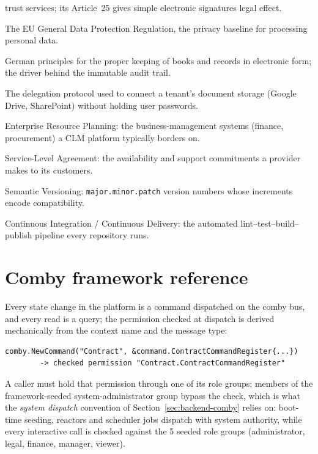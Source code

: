 \begin{description}[itemsep=1pt, font=\normalfont\bfseries]
    trust services; its Article~25 gives simple electronic signatures
    legal effect.
  \item[GDPR] The EU General Data Protection Regulation, the privacy
    baseline for processing personal data.
  \item[GoBD] German principles for the proper keeping of books and
    records in electronic form; the driver behind the immutable audit
    trail.
  \item[OAuth~2.0] The delegation protocol used to connect a tenant's
    document storage (Google Drive, SharePoint) without holding user
    passwords.
  \item[ERP] Enterprise Resource Planning: the business-management
    systems (finance, procurement) a CLM platform typically borders on.
  \item[SLA] Service-Level Agreement: the availability and support
    commitments a provider makes to its customers.
  \item[Semver] Semantic Versioning: \texttt{major.minor.patch} version
    numbers whose increments encode compatibility.
  \item[CI/CD] Continuous Integration / Continuous Delivery: the
    automated lint--test--build--publish pipeline every repository runs.
\end{description}

\section{Comby framework reference}
\label{sec:app-comby}

Every state change in the platform is a command dispatched on the comby
bus, and every read is a query; the permission checked at dispatch is
derived mechanically from the context name and the message type:

\begin{lstlisting}[language=golang]
comby.NewCommand("Contract", &command.ContractCommandRegister{...})
        -> checked permission "Contract.ContractCommandRegister"
\end{lstlisting}

A caller must hold that permission through one of its role groups;
members of the framework-seeded system-administrator group bypass the
check, which is what the \emph{system dispatch} convention of
Section~\ref{sec:backend-comby} relies on: boot-time seeding, reactors and scheduler jobs
dispatch with system authority, while every interactive call is checked
against the 5 seeded role groups (administrator, legal, finance,
manager, viewer).

